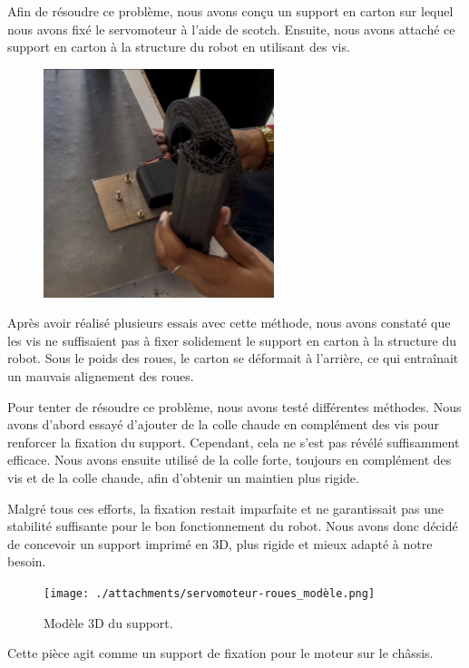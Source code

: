\documentclass[a4paper,12pt]{report}  %
\begin{document}
Afin de résoudre ce problème, nous avons conçu un support en carton sur lequel nous avons fixé le servomoteur à l’aide de scotch. Ensuite, nous avons attaché ce support en carton à la structure du robot en utilisant des vis. 

\begin{figure}[H]
	\centering
	\includegraphics[width=0.6\textwidth]{./attachments/servomoteur-roues_vis.png}
\end{figure}

Après avoir réalisé plusieurs essais avec cette méthode, nous avons constaté que les vis ne suffisaient pas à fixer solidement le support en carton à la structure du robot. Sous le poids des roues, le carton se déformait à l’arrière, ce qui entraînait un mauvais alignement des roues.

Pour tenter de résoudre ce problème, nous avons testé différentes méthodes. Nous avons d’abord essayé d’ajouter de la colle chaude en complément des vis pour renforcer la fixation du support. Cependant, cela ne s’est pas révélé suffisamment efficace. Nous avons ensuite utilisé de la colle forte, toujours en complément des vis et de la colle chaude, afin d’obtenir un maintien plus rigide.

Malgré tous ces efforts, la fixation restait imparfaite et ne garantissait pas une stabilité suffisante pour le bon fonctionnement du robot. Nous avons donc décidé de concevoir un support imprimé en 3D, plus rigide et mieux adapté à notre besoin.

\begin{figure}[H]
	\centering
	\texttt{[image: ./attachments/servomoteur-roues\_modèle.png]}
	\caption{Modèle 3D du support.}
\end{figure}

Cette pièce agit comme un support de fixation pour le moteur sur le châssis.
\end{document}
